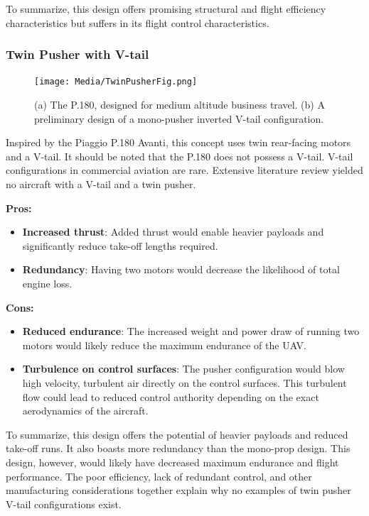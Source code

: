 \documentclass[12pt]{article}
\begin{document}
	To summarize, this design offers promising structural and flight efficiency characteristics but suffers in its flight control characteristics.
	
	\newpage
	
	\subsubsection{Twin Pusher with V-tail}
	\begin{figure}[h!]
		\centering
		\texttt{[image: Media/TwinPusherFig.png]} %
		\caption{(a) The P.180, designed for medium altitude business travel. (b) A preliminary design of a mono-pusher inverted V-tail configuration.}
		\label{fig:twin_pusher}
	\end{figure}
	Inspired by the Piaggio P.180 Avanti, this concept uses twin rear-facing motors and a V-tail. It should be noted that the P.180 does not possess a V-tail. V-tail configurations in commercial aviation are rare. Extensive literature review yielded no aircraft with a V-tail and a twin pusher. 
	
	\textbf{Pros:}
	\begin{itemize}
		\item \textbf{Increased thrust}: Added thrust would enable heavier payloads and significantly reduce take-off lengths required.
		\item \textbf{Redundancy}: Having two motors would decrease the likelihood of total engine loss.
	\end{itemize}
	
	\textbf{Cons:}
	\begin{itemize}
		\item \textbf{Reduced endurance}: The increased weight and power draw of running two motors would likely reduce the maximum endurance of the UAV.
		\item \textbf{Turbulence on control surfaces}: The pusher configuration would blow high velocity, turbulent air directly on the control surfaces. This turbulent flow could lead to reduced control authority depending on the exact aerodynamics of the aircraft.
	\end{itemize}
	
	To summarize, this design offers the potential of heavier payloads and reduced take-off runs. It also boasts more redundancy than the mono-prop design. This design, however, would likely have decreased maximum endurance and flight performance. The poor efficiency, lack of redundant control, and other manufacturing considerations together explain why no examples of twin pusher V-tail configurations exist.
	
\end{document}
